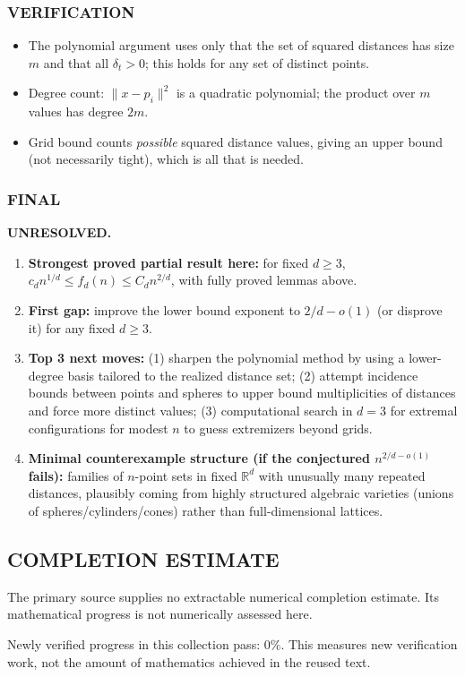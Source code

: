 \subsubsection*{VERIFICATION}
\begin{itemize}
\item The polynomial argument uses only that the set of squared distances has size \(m\) and that all \(\delta_t>0\); this holds for any set of distinct points.
\item Degree count: \(\|x-p_i\|^2\) is a quadratic polynomial; the product over \(m\) values has degree \(2m\).
\item Grid bound counts \emph{possible} squared distance values, giving an upper bound (not necessarily tight), which is all that is needed.
\end{itemize}

\subsubsection*{FINAL}
\textbf{UNRESOLVED.}
\begin{enumerate}
\item[(i)] \textbf{Strongest proved partial result here:} for fixed \(d\ge 3\),
\(c_d n^{1/d}\le f_d(n)\le C_d n^{2/d}\), with fully proved lemmas above.
\item[(ii)] \textbf{First gap:} improve the lower bound exponent to \(2/d-o(1)\) (or disprove it) for any fixed \(d\ge 3\).
\item[(iii)] \textbf{Top 3 next moves:}
(1) sharpen the polynomial method by using a lower-degree basis tailored to the realized distance set;
(2) attempt incidence bounds between points and spheres to upper bound multiplicities of distances and force more distinct values;
(3) computational search in \(d=3\) for extremal configurations for modest \(n\) to guess extremizers beyond grids.
\item[(iv)] \textbf{Minimal counterexample structure (if the conjectured \(n^{2/d-o(1)}\) fails):}
families of \(n\)-point sets in fixed \(\mathbb{R}^d\) with unusually many repeated distances, plausibly coming from highly structured algebraic varieties (unions of spheres/cylinders/cones) rather than full-dimensional lattices.
\end{enumerate}




\subsection*{COMPLETION ESTIMATE}
The primary source supplies no extractable numerical completion estimate. Its mathematical progress is not numerically assessed here.

Newly verified progress in this collection pass: $0\%$. This measures new verification work, not the amount of mathematics achieved in the reused text.

